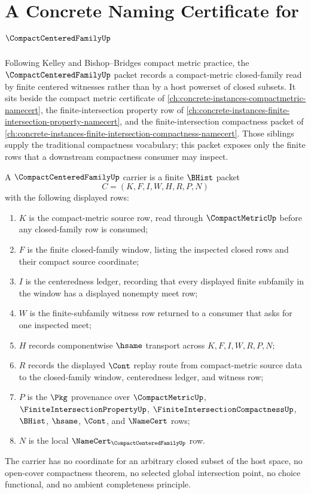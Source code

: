 \chapter{A Concrete Naming Certificate for $\CompactCenteredFamilyUp$}
\label{ch:concrete-instances-compact-centered-family-namecert}

Following Kelley and Bishop--Bridges compact metric practice, the $\CompactCenteredFamilyUp$ packet records a compact-metric closed-family read by finite centered witnesses rather than by a host powerset of closed subsets. It sits beside the compact metric certificate of \autoref{ch:concrete-instances-compactmetric-namecert}, the finite-intersection property row of \autoref{ch:concrete-instances-finite-intersection-property-namecert}, and the finite-intersection compactness packet of \autoref{ch:concrete-instances-finite-intersection-compactness-namecert}. Those siblings supply the traditional compactness vocabulary; this packet exposes only the finite rows that a downstream compactness consumer may inspect.

\begin{definition}
\label{def:compact-centered-family-carrier}
A $\CompactCenteredFamilyUp$ carrier is a finite $\BHist$ packet
$$
C=(K,F,I,W,H,R,P,N)
$$
with the following displayed rows:
\begin{enumerate}
\item $K$ is the compact-metric source row, read through $\CompactMetricUp$ before any closed-family row is consumed;
\item $F$ is the finite closed-family window, listing the inspected closed rows and their compact source coordinate;
\item $I$ is the centeredness ledger, recording that every displayed finite subfamily in the window has a displayed nonempty meet row;
\item $W$ is the finite-subfamily witness row returned to a consumer that asks for one inspected meet;
\item $H$ records componentwise $\hsame$ transport across $K,F,I,W,R,P,N$;
\item $R$ records the displayed $\Cont$ replay route from compact-metric source data to the closed-family window, centeredness ledger, and witness row;
\item $P$ is the $\Pkg$ provenance over $\CompactMetricUp$, $\FiniteIntersectionPropertyUp$, $\FiniteIntersectionCompactnessUp$, $\BHist$, $\hsame$, $\Cont$, and $\NameCert$ rows;
\item $N$ is the local $\NameCert_{\CompactCenteredFamilyUp}$ row.
\end{enumerate}
The carrier has no coordinate for an arbitrary closed subset of the host space, no open-cover compactness theorem, no selected global intersection point, no choice functional, and no ambient completeness principle.
\end{definition}

